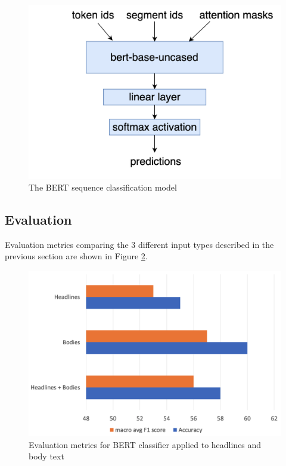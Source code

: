 \begin{figure}
    \centering
    \includegraphics[scale=0.2]{0-img/bert-sequence-classification.png}
    \caption{The BERT sequence classification model}
    \label{fig:bert-sequence-classification}
\end{figure}

\subsection{Evaluation} \label{subsec:nmr-bert-evaluation}

Evaluation metrics comparing the 3 different input types described in the previous section are shown in Figure \ref{fig:nmr-accuracy-f1}.


\begin{figure}
    \centering
    \includegraphics[scale=0.3]{0-img/nmr-accuracy-f1.png}
    \caption{Evaluation metrics for BERT classifier applied to headlines and body text}
    \label{fig:nmr-accuracy-f1}
\end{figure}

